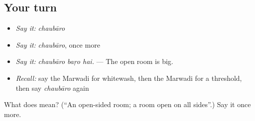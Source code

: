 \subsection*{Your turn}
\begin{itemize}
\raggedright
  \item \emph{Say it:} \emph{chaubāro}
  \item \emph{Say it:} \emph{chaubāro}, once more
  \item \emph{Say it:} \emph{chaubāro baṛo hai.} — The open room is big.
  \item \emph{Recall:} say the Marwadi for whitewash, then the Marwadi for a threshold, then say \emph{chaubāro} again
\end{itemize}

\begin{tcolorbox}[breakable,colback=teal!4,colframe=teal!35!black,title={Before you move on}]
What does  mean? (\textquotedblleft{}An open-sided room; a room open on all sides\textquotedblright{}.) Say it once more.
\end{tcolorbox}
